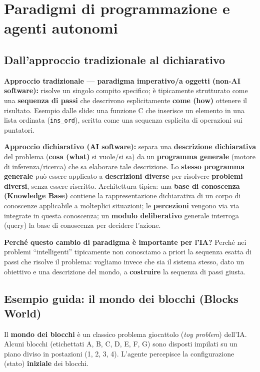 \documentclass[11pt,a4paper]{report}
\begin{document}
\section{Paradigmi di programmazione e agenti autonomi}

\subsection{Dall'approccio tradizionale al dichiarativo}

\textbf{Approccio tradizionale --- paradigma imperativo/a oggetti (non-AI software):} risolve un singolo compito specifico; è tipicamente strutturato come una \textbf{sequenza di passi} che descrivono esplicitamente \textbf{come (how)} ottenere il risultato. Esempio dalle slide: una funzione C che inserisce un elemento in una lista ordinata (\texttt{ins\_ord}), scritta come una sequenza esplicita di operazioni sui puntatori.

\textbf{Approccio dichiarativo (AI software):} separa una \textbf{descrizione dichiarativa} del problema (\textbf{cosa (what)} si vuole/si sa) da un \textbf{programma generale} (motore di inferenza/ricerca) che sa elaborare tale descrizione. Lo \textbf{stesso programma generale} può essere applicato a \textbf{descrizioni diverse} per risolvere \textbf{problemi diversi}, senza essere riscritto. Architettura tipica: una \textbf{base di conoscenza (Knowledge Base)} contiene la rappresentazione dichiarativa di un corpo di conoscenze applicabile a molteplici situazioni; le \textbf{percezioni} vengono via via integrate in questa conoscenza; un \textbf{modulo deliberativo} generale interroga (query) la base di conoscenza per decidere l'azione.

\textbf{Perché questo cambio di paradigma è importante per l'IA?} Perché nei problemi ``intelligenti'' tipicamente non conosciamo a priori la sequenza esatta di passi che risolve il problema: vogliamo invece che sia il sistema stesso, dato un obiettivo e una descrizione del mondo, a \textbf{costruire} la sequenza di passi giusta.

\subsection{Esempio guida: il mondo dei blocchi (Blocks World)}

Il \textbf{mondo dei blocchi} è un classico problema giocattolo (\emph{toy problem}) dell'IA. Alcuni blocchi (etichettati A, B, C, D, E, F, G) sono disposti impilati su un piano diviso in postazioni (1, 2, 3, 4). L'agente percepisce la configurazione (stato) \textbf{iniziale} dei blocchi.
\end{document}
